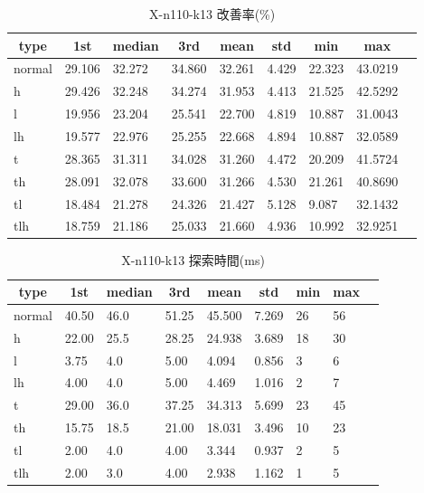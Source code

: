 \begin{table}[htbp]
    \caption{X-n110-k13 改善率(\%)}
    \begin{tabular}{|l|l|l|l|l|l|l|l|l|}\hline
    \multicolumn{1}{|c|}{\textbf{type}}
    &\multicolumn{1}{|c|}{\textbf{1st}}
    &\multicolumn{1}{c|}{\textbf{median}}
    &\multicolumn{1}{c|}{\textbf{3rd}}
    &\multicolumn{1}{c|}{\textbf{mean}}
    &\multicolumn{1}{c|}{\textbf{std}}
    &\multicolumn{1}{c|}{\textbf{min}}
    &\multicolumn{1}{c|}{\textbf{max}}\\\hline
	normal & 29.106 & 32.272 & 34.860 & 32.261 & 4.429 & 22.323 & 43.0219\\\hline
	h & 29.426 & 32.248 & 34.274 & 31.953 & 4.413 & 21.525 & 42.5292\\\hline
	l & 19.956 & 23.204 & 25.541 & 22.700 & 4.819 & 10.887 & 31.0043\\\hline
	lh & 19.577 & 22.976 & 25.255 & 22.668 & 4.894 & 10.887 & 32.0589\\\hline
	t & 28.365 & 31.311 & 34.028 & 31.260 & 4.472 & 20.209 & 41.5724\\\hline
	th & 28.091 & 32.078 & 33.600 & 31.266 & 4.530 & 21.261 & 40.8690\\\hline
	tl & 18.484 & 21.278 & 24.326 & 21.427 & 5.128 & 9.087 & 32.1432\\\hline
	tlh & 18.759 & 21.186 & 25.033 & 21.660 & 4.936 & 10.992 & 32.9251\\\hline
	\end{tabular}
\end{table}
\begin{table}[htbp]
    \caption{X-n110-k13 探索時間(ms)}
    \begin{tabular}{|l|l|l|l|l|l|l|l|l|}\hline
    \multicolumn{1}{|c|}{\textbf{type}}
    &\multicolumn{1}{|c|}{\textbf{1st}}
    &\multicolumn{1}{c|}{\textbf{median}}
    &\multicolumn{1}{c|}{\textbf{3rd}}
    &\multicolumn{1}{c|}{\textbf{mean}}
    &\multicolumn{1}{c|}{\textbf{std}}
    &\multicolumn{1}{c|}{\textbf{min}}
    &\multicolumn{1}{c|}{\textbf{max}}\\\hline
	normal & 40.50 & 46.0 & 51.25 & 45.500 & 7.269 & 26 & 56\\\hline
	h & 22.00 & 25.5 & 28.25 & 24.938 & 3.689 & 18 & 30\\\hline
	l & 3.75 & 4.0 & 5.00 & 4.094 & 0.856 & 3 & 6\\\hline
	lh & 4.00 & 4.0 & 5.00 & 4.469 & 1.016 & 2 & 7\\\hline
	t & 29.00 & 36.0 & 37.25 & 34.313 & 5.699 & 23 & 45\\\hline
	th & 15.75 & 18.5 & 21.00 & 18.031 & 3.496 & 10 & 23\\\hline
	tl & 2.00 & 4.0 & 4.00 & 3.344 & 0.937 & 2 & 5\\\hline
	tlh & 2.00 & 3.0 & 4.00 & 2.938 & 1.162 & 1 & 5\\\hline
	\end{tabular}
\end{table}
